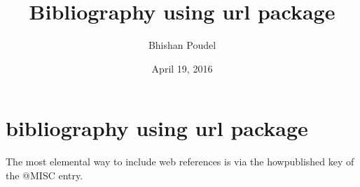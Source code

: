 \documentclass{article}
\author{Bhishan Poudel}
\title{Bibliography using url package}
\date{April 19, 2016}
\begin{document}
\maketitle

\section{bibliography using url package}
The most elemental way to include web references is via the howpublished key of the @MISC entry.


\nocite{Doe:2009:Misc}

\end{document}
